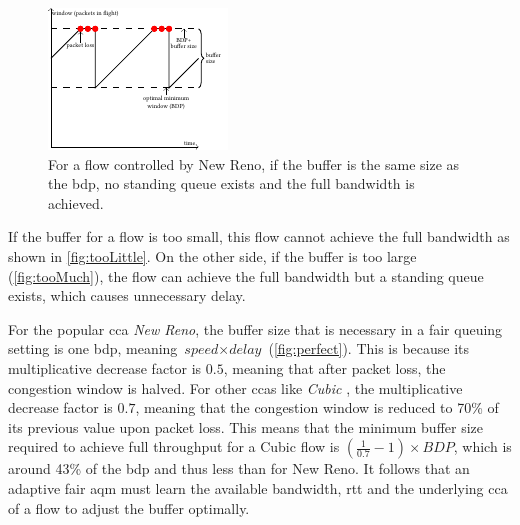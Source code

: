 \documentclass[conference]{IEEEtran}
\begin{document}
\begin{figure}[h]
\includegraphics[width=\columnwidth]{figures/cocoa_illustration_perfect.pdf}
\caption{For a flow controlled by New Reno, if the buffer is the same size as the \gls{bdp}, no standing queue exists and the full bandwidth is achieved.}
\label{fig:perfect}
\end{figure}

If the buffer for a flow is too small, this flow cannot achieve the full bandwidth as shown in \autoref{fig:tooLittle}. On the other side, if the buffer is too large (\autoref{fig:tooMuch}), the flow can achieve the full bandwidth but a standing queue exists, which causes unnecessary delay.  

For the popular \gls{cca} \textit{New Reno}, the buffer size that is necessary in a fair queuing setting is one \gls{bdp}, meaning $\textit{speed}\times\textit{delay}$ (\autoref{fig:perfect}). This is because its multiplicative decrease factor is $0.5$, meaning that after packet loss, the congestion window is halved. For other \glspl{cca} like \textit{Cubic} \cite{ha_cubic:_2008}, the multiplicative decrease factor is $0.7$, meaning that the congestion window is reduced to 70\% of its previous value upon packet loss. This means that the minimum buffer size required to achieve full throughput for a Cubic flow is $\left(\frac{1}{0.7}-1\right)\times \textit{BDP}$, which is around 43\% of the \gls{bdp} and thus less than for New Reno. It follows that an adaptive fair \gls{aqm} must learn the available bandwidth, \gls{rtt} and the underlying \gls{cca} of a flow to adjust the buffer optimally. 
\end{document}
